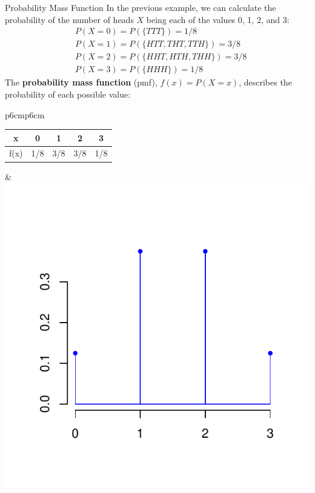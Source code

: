 \documentclass[xcolor=table]{beamer}
\renewcommand{\emph}{\textbf}
\begin{document}
\begin{frame}{Probability Mass Function}
In the previous example, we can calculate the probability of the number of heads $X$ being each of the values 0, 1, 2, and 3:
\begin{align*}
&P(X=0) = P(\{TTT\}) = 1/8 \\
&P(X=1) = P(\{HTT, THT, TTH \}) = 3/8 \\
&P(X=2) = P(\{HHT, HTH, THH\}) = 3/8 \\
&P(X=3) = P(\{HHH\}) = 1/8
\end{align*}
\pause The \emph{probability mass function} (pmf), $f(x)=P(X=x)$, describes the probability of each possible value:
\begin{center}
\begin{tabular}{p{6cm}p{6cm}}
\vspace{0cm}
\begin{tabular}{c||c|c|c|c}
x & 0 & 1 & 2 & 3 \\ \hline
f(x) & 1/8 & 3/8 & 3/8 & 1/8
\end{tabular}&
\vspace{-2cm}
\includegraphics[scale=.5]{ch3_pmf.pdf}
\end{tabular}
\end{center}
\end{frame}
\end{document}
